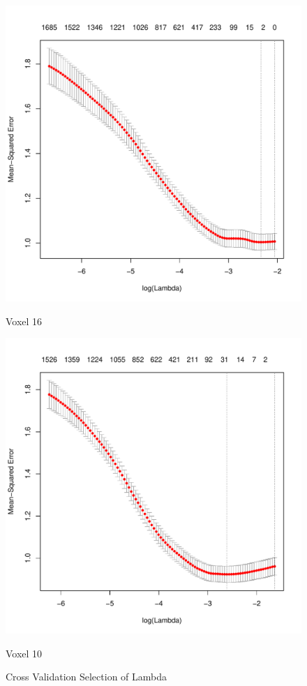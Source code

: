 \documentclass[english]{amsart}
\begin{document}
\begin{figure}[H]
  \includegraphics[width=\linewidth]{cv_lasso16.pdf}
  \caption{Voxel 16}
\endminipage\hfill
\vspace{-5mm}
  \includegraphics[width=\linewidth]{cv_lasso10.pdf}
  \caption{Voxel 10}
\endminipage
\caption{Cross Validation Selection of Lambda}
\end{figure}
\vspace{-10mm}
\end{document}
